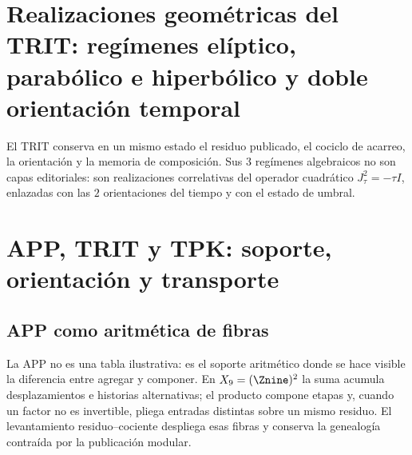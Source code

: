 \label{chap:83-02}

\section{Realizaciones geométricas del TRIT: regímenes elíptico, parabólico e hiperbólico y doble orientación temporal}

El TRIT conserva en un mismo estado el residuo publicado, el cociclo de
acarreo, la orientación y la memoria de composición. Sus \(3\) regímenes
algebraicos no son capas editoriales: son realizaciones correlativas del
operador cuadrático \(J_{\tau}^{2}=-\tau I\), enlazadas con las \(2\)
orientaciones del tiempo y con el estado de umbral.

\begin{HMTScientificOwnerSubordinated}
\def\HMTTRITFormal{1}
\def\HMTTRITDevelopments{1}

\let\HMTTRITFormal\undefined
\let\HMTTRITDevelopments\undefined
\end{HMTScientificOwnerSubordinated}

\begin{HMTScientificOwnerSubordinated}

\end{HMTScientificOwnerSubordinated}

\begin{HMTScientificOwnerSubordinated}

\end{HMTScientificOwnerSubordinated}

\section[APP, TRIT y TPK: soporte, orientación y transporte]
{APP, TRIT y TPK: soporte, orientación y transporte}

\subsection{APP como aritmética de fibras}

La APP no es una tabla ilustrativa: es el soporte aritmético donde se hace
visible la diferencia entre agregar y componer. En
\(
X_9=(\Znine)^2
\)
la suma acumula desplazamientos e historias alternativas; el producto compone
etapas y, cuando un factor no es invertible, pliega entradas distintas sobre
un mismo residuo. El levantamiento residuo--cociente despliega esas fibras y
conserva la genealogía contraída por la publicación modular.


